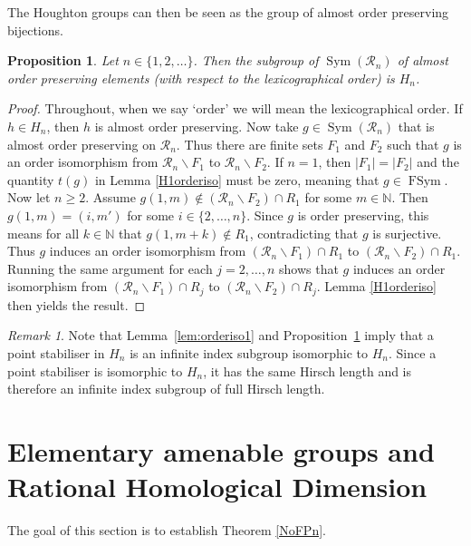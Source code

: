 \documentclass[11pt,a4paper]{amsart}
\renewcommand{\setminus}{\smallsetminus}
\newtheorem{proposition}[theorem]{Proposition}
\theoremstyle{definition}
\theoremstyle{remark}
\newtheorem{remark}[theorem]{Remark}
\newcommand{\Sym}{\operatorname{Sym}}
\newcommand{\FSym}{\operatorname{FSym}}
\newcommand{\N}{\mathbb N}
\newcommand{\Ra}{\mathcal{R}}
\begin{document}
The Houghton groups can then be seen as the group of almost order preserving bijections.
\begin{proposition}\label{aopisHou}
Let $n\in \{1, 2, \ldots\}$. Then the subgroup of $\Sym(\Ra_n)$ of almost order preserving elements (with respect to the lexicographical order) is $H_n$.
\end{proposition}
\begin{proof}
Throughout, when we say `order' we will mean the lexicographical order. If $h\in H_n$, then $h$ is almost order preserving. Now take $g\in \Sym(\Ra_n)$ that is almost order preserving on $\Ra_n$. Thus there are finite sets $F_1$ and $F_2$ such that $g$ is an order isomorphism from $\Ra_n\setminus F_1$ to $\Ra_n\setminus F_2$. If $n=1$, then $|F_1|=|F_2|$ and the quantity $t(g)$ in Lemma \ref{H1orderiso} must be zero, meaning that $g\in \FSym$. Now let $n\ge 2$. Assume $g(1, m)\not\in (\Ra_n\setminus F_2)\cap R_1$ for some $m\in \N$. Then $g(1, m)=(i, m')$ for some $i\in\{2, \ldots, n\}$. Since $g$ is order preserving, this means for all $k\in \N$ that $g(1, m+k)\not\in R_1$, contradicting that $g$ is surjective. Thus $g$ induces an order isomorphism from $(\Ra_n\setminus F_1)\cap R_1$ to $(\Ra_n\setminus F_2)\cap R_1$. Running the same argument for each $j=2, \ldots, n$ shows that $g$ induces an order isomorphism from $(\Ra_n\setminus F_1)\cap R_j$ to $(\Ra_n\setminus F_2)\cap R_j$. Lemma \ref{H1orderiso} then yields the result.
\end{proof}


\begin{remark} \label{point stab}
Note that Lemma~\ref{lem:orderiso1} and Proposition~\ref{aopisHou} imply that a point stabiliser in $H_n$ is an infinite index subgroup isomorphic to $H_n$. Since a point stabiliser is isomorphic to $H_n$, it has the same Hirsch length and is therefore an infinite index subgroup of full Hirsch length. 	
\end{remark}


\section{Elementary amenable groups and Rational Homological Dimension}


The goal of this section is to establish Theorem \ref{NoFPn}. 
\end{document}
